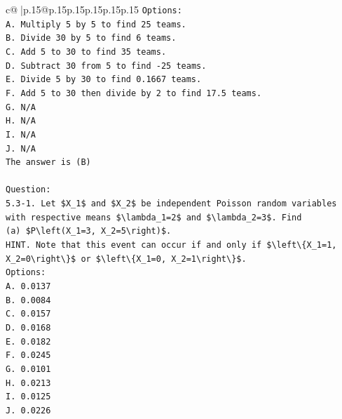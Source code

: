 \documentclass{article}
\begin{document}
{\begin{supertabular}{c@{$\;$}|p{.15\linewidth}@{}p{.15\linewidth}p{.15\linewidth}p{.15\linewidth}p{.15\linewidth}p{.15\linewidth}}
{{{\texttt{Options:} \\
\texttt{A. Multiply 5 by 5 to find 25 teams.} \\
\texttt{B. Divide 30 by 5 to find 6 teams.} \\
\texttt{C. Add 5 to 30 to find 35 teams.} \\
\texttt{D. Subtract 30 from 5 to find {-}25 teams.} \\
\texttt{E. Divide 5 by 30 to find 0.1667 teams.} \\
\texttt{F. Add 5 to 30 then divide by 2 to find 17.5 teams.} \\
\texttt{G. N/A} \\
\texttt{H. N/A} \\
\texttt{I. N/A} \\
\texttt{J. N/A} \\
\texttt{The answer is (B)} \\
\\ 
\texttt{Question:} \\
\texttt{5.3{-}1. Let \$X\_1\$ and \$X\_2\$ be independent Poisson random variables with respective means \$\textbackslash{}lambda\_1=2\$ and \$\textbackslash{}lambda\_2=3\$. Find} \\
\texttt{(a) \$P\textbackslash{}left(X\_1=3, X\_2=5\textbackslash{}right)\$.} \\
\texttt{HINT. Note that this event can occur if and only if \$\textbackslash{}left\textbackslash{}\{X\_1=1, X\_2=0\textbackslash{}right\textbackslash{}\}\$ or \$\textbackslash{}left\textbackslash{}\{X\_1=0, X\_2=1\textbackslash{}right\textbackslash{}\}\$.} \\
\texttt{Options:} \\
\texttt{A. 0.0137} \\
\texttt{B. 0.0084} \\
\texttt{C. 0.0157} \\
\texttt{D. 0.0168} \\
\texttt{E.  0.0182} \\
\texttt{F. 0.0245} \\
\texttt{G. 0.0101} \\
\texttt{H. 0.0213} \\
\texttt{I. 0.0125} \\
\texttt{J. 0.0226} \\
            }
        }
    }
     \\ \\


\end{supertabular}}
\end{document}
